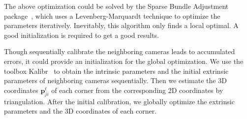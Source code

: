 The above optimization could be solved by the Sparse Bundle Adjustment package~\cite{lour09}, which uses a Levenberg-Marquardt technique to optimize the parameters iteratively. 
Inevitably, this algorithm only finds a local optimal. 
A good initialization is required to get a good results. 


Though sequentially calibrate the neighboring cameras leads to accumulated errors, it could provide an initialization for the global optimization.
% 
We use the toolbox Kalibr~\cite{Maye2013Self} to obtain the intrinsic parameters and the initial extrinsic parameters of neighboring cameras sequentially. 
%
Then we estimate the 3D coordinates $\mathbf{p}^{t}_{ji}$ of each corner from the corresponding 2D coordinates by triangulation.
%
After the initial calibration, we globally optimize the extrinsic parameters and the 3D coordinates of each corner.





